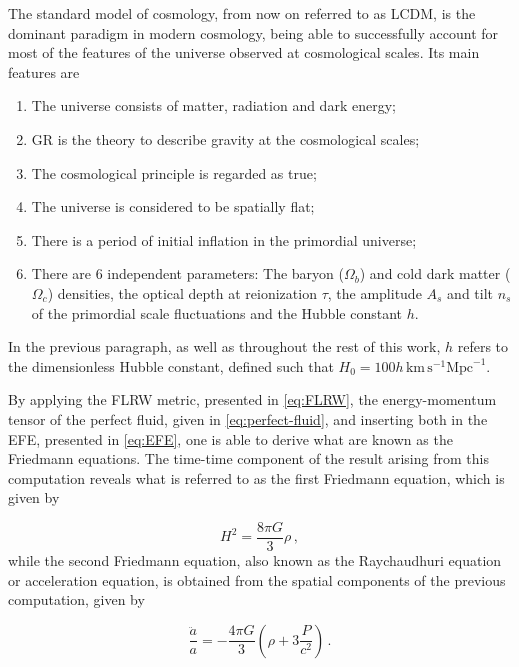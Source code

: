 The standard model of cosmology, from now on referred to as \gls{LCDM}, is the dominant paradigm in modern cosmology, being able to successfully account for most of the features of the universe observed at cosmological scales. Its main features are \cite{LCDM-R2021}

\begin{enumerate}
    \item The universe consists of matter, radiation and dark energy;
    \item \gls{GR} is the theory to describe gravity at the cosmological scales;
    \item The cosmological principle is regarded as true;
    \item The universe is considered to be spatially flat;
    \item There is a period of initial inflation in the primordial universe;
    \item There are 6 independent parameters: The baryon ($\Omega_b$) and cold dark matter ($\Omega_c$) densities, the optical depth at reionization $\tau$, the amplitude $A_s$ and tilt $n_s$ of the primordial scale fluctuations and the Hubble constant $h$.
\end{enumerate}
In the previous paragraph, as well as throughout the rest of this work, $h$ refers to the dimensionless Hubble constant, defined such that $H_0 = 100h \, \text{km} \, \text{s}^{-1} \text{Mpc}^{-1}$.

By applying the \gls{FLRW} metric, presented in \cref{eq:FLRW}, the energy-momentum tensor of the perfect fluid, given in \cref{eq:perfect-fluid}, and inserting both in the \gls{EFE}, presented in \cref{eq:EFE}, one is able to derive what are known as the Friedmann equations. The time-time component of the result arising from this computation reveals what is referred to as the first Friedmann equation, which is given by

\begin{equation}
    \label{eq:friedmann-1}
    H^2 = \frac{8 \pi G}{3} \rho \,,
\end{equation}
while the second Friedmann equation, also known as the Raychaudhuri equation or acceleration equation, is obtained from the spatial components of the previous computation, given by

\begin{equation}
    \label{eq:friedmann-2}
    \frac{\ddot{a}}{a} = - \frac{4 \pi G}{3} \left(\rho + 3\frac{P}{c^2}\right) \,.
\end{equation}

